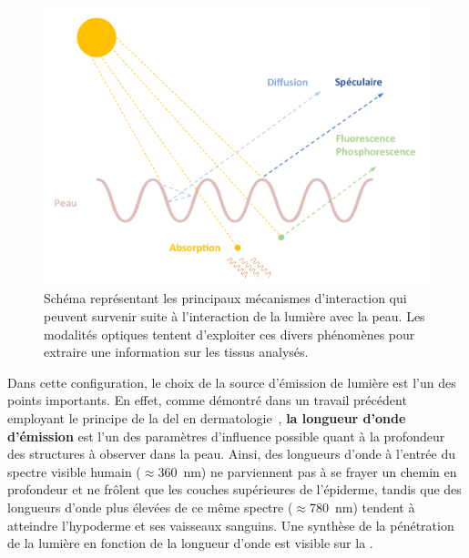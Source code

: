 \begin{figure}[H]
    \centering
    \includegraphics[width=\linewidth]{contents/chapter_2/resources/scheme_light_interaction.pdf}
    \caption{Schéma représentant les principaux mécanismes d'interaction qui peuvent survenir suite à l'interaction de la lumière avec la peau. Les modalités optiques tentent d'exploiter ces divers phénomènes pour extraire une information sur les tissus analysés.}
    \label{fig:scheme_light_interaction}
\end{figure}\par

Dans cette configuration, le choix de la source d'émission de lumière est l'un des points importants. En effet, comme démontré dans un travail précédent employant le principe de la \gls{del} en dermatologie~\cite{Barolet2008}, \textbf{la longueur d'onde d'émission} est l'un des paramètres d'influence possible quant à la profondeur des structures à observer dans la peau. Ainsi, des longueurs d'onde à l'entrée du spectre visible humain ($\approx$\SI{360}{\nano\metre}) ne parviennent pas à se frayer un chemin en profondeur et ne frôlent que les couches supérieures de l'épiderme, tandis que des longueurs d'onde plus élevées de ce même spectre ($\approx$\SI{780}{\nano\metre}) tendent à atteindre l'hypoderme et ses vaisseaux sanguins. Une synthèse de la pénétration de la lumière en fonction de la longueur d'onde est visible sur la .\par

